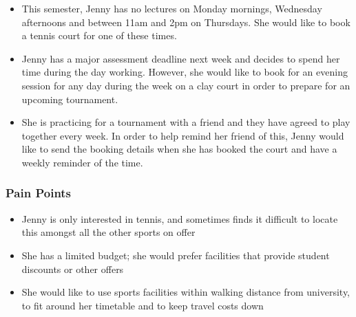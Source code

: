\begin{itemize}
	\item This semester, Jenny has no lectures on Monday mornings,
		Wednesday afternoons and between 11am and 2pm on Thursdays.
		She would like to book a tennis court for one of these times.

	\item Jenny has a major assessment deadline next week and decides
		to spend her time during the day working. However, she would
		like to book for an evening session for any day during the
		week on a clay court in order to prepare for an upcoming
		tournament.

	\item She is practicing for a tournament with a friend and they have
		agreed to play together every week. In order to help remind her
		friend of this, Jenny would like to send the booking details when she
		has booked the court and have a weekly reminder of the time.
\end{itemize}


\subsubsection*{Pain Points}
\label{ssub:student_pain_points}

\begin{itemize}
	\item Jenny is only interested in tennis, and sometimes finds it
		difficult to locate this amongst all the other sports on offer

	\item She has a limited budget; she would prefer facilities that
		provide student discounts or other offers

	\item She would like to use sports facilities within walking
		distance from university, to fit around her timetable and to
		keep travel costs down
\end{itemize}


